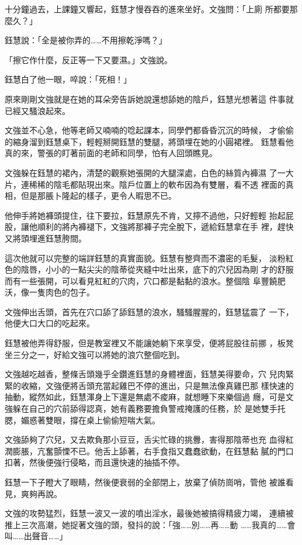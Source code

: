 十分鐘過去，上課鐘又響起，鈺慧才慢吞吞的進來坐好。文強問：「上廁
所都要那麼久？」

鈺慧說：「全是被你弄的……不用擦乾淨嗎？」

「擦它作什麼，反正等一下又要濕。」文強說。

鈺慧白了他一眼，啐說：「死相！」

原來剛剛文強就是在她的耳朵旁告訴她說還想舔她的陰戶，鈺慧光想著這
件事就已經又騷浪起來。

文強並不心急，他等老師又喃喃的唸起課本，同學們都昏昏沉沉的時候，
才偷偷的縮身溜到鈺慧桌下，輕輕掰開鈺慧的雙腿，將頭埋在她的小圓裙裡。
鈺慧看他真的來，警張的盯著前面的老師和同學，怕有人回頭瞧見。

文強躲在鈺慧的裙內，清楚的觀察她張開的大腿深處，白色的絲質內褲濕
了一大片，連稀稀的陰毛都貼現出來。陰戶位置上的軟布因為有雙層，看不透
裡面的真相，但是那脹卜隆起的樣子，更令人暇思不已。

他伸手將她褲頭提住，往下要拉，鈺慧原先不肯，又擰不過他，只好輕輕
抬起屁股，讓他順利的將內褲褪下，文強將那褲子完全脫下，遞給鈺慧拿在手
裡，趕快又將頭埋進鈺慧胯間。

這次他就可以完整的端詳鈺慧的真實面貌。鈺慧有整齊而不濃密的毛髮，
淡粉紅色的陰唇，小小的一點尖尖的陰蒂從夾縫中吐出來，底下的穴兒因為剛
才的舒服而有一些張開，可以看見紅紅的穴肉，穴口都是黏黏的浪水。整個陰
阜豐饒肥沃，像一隻肉色的包子。

文強伸出舌頭，首先在穴口舔了舔鈺慧的浪水，騷騷腥腥的，鈺慧猛震了
一下，他便大口大口的吃起來。

鈺慧被他弄得舒服，但是教室裡又不能讓她躺下來享受，便將屁股往前挪
，板凳坐三分之一，好給文強可以將她的浪穴整個吃到。

文強越吃越香，整條舌頭幾乎全鑽進鈺慧的身體裡面，鈺慧美得要命，穴
兒肉緊緊的收縮，文強便將舌頭充當起雞巴不停的進出，只是無法像真雞巴那
樣快速的抽動，縱然如此，鈺慧渾身上下還是無處不痠麻，就想睡下來樂個過
癮，可是文強躲在自己的穴前舔得認真，她有義務要擔負警戒掩護的任務，於
是她雙手托腮，媚惑著雙眼，撐在桌上偷偷短喘大氣。

文強舔夠了穴兒，又去欺負那小豆豆，舌尖忙碌的挑釁，害得那陰蒂也充
血得紅潤膨脹，亢奮顫慄不已。他舌上舔著，右手食指又蠢蠢欲動，在鈺慧黏
膩的門口扣著，然後便強行侵略，而且還快速的抽插不停。

鈺慧一下子瞪大了眼睛，然後便衰弱的全部閉上，放棄了偵防崗哨，管他
被誰看見，爽夠再說。

文強的攻勢猛烈，鈺慧一波又一波的噴出淫水，最後她被搞得精疲力竭，
連續被推上三次高潮，她捉著文強的頭，發抖的說：「強……別……再……動
……我真的……會叫……出聲音……」

